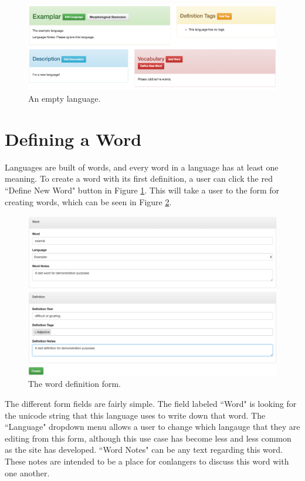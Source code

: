 \begin{figure}[h]
\includegraphics[width=\textwidth]{figures/empty-language-logged-in}
\caption{An empty language.}
\centering
\label{fig:empty-language-logged-in}
\end{figure}

\section{Defining a Word}
\label{sec:define-word}

Languages are built of words, and every word in a language has at least one meaning. To create a word with its first definition, a user can click the red ``Define New Word" button in Figure \ref{fig:empty-language-logged-in}. This will take a user to the form for creating words, which can be seen in Figure \ref{fig:define-word}.

\begin{figure}[h]
\includegraphics[width=\textwidth]{figures/define-word-filled-in}
\caption{The word definition form.}
\centering
\label{fig:define-word}
\end{figure}

The different form fields are fairly simple. The field labeled ``Word" is looking for the unicode string that this language uses to write down that word. The ``Language" dropdown menu allows a user to change which langauge that they are editing from this form, although this use case has become less and less common as the site has developed. ``Word Notes" can be any text regarding this word. These notes are intended to be a place for conlangers to discuss this word with one another.

